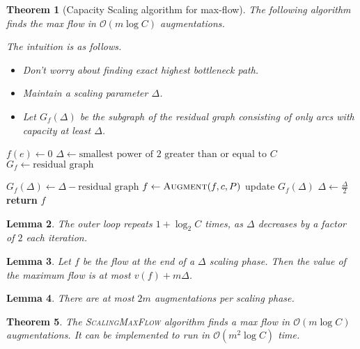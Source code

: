 \documentclass[10pt, oneside, reqno]{amsart}
\theoremstyle{plain}%
\newtheorem{thm}{Theorem}[section]
\newtheorem{lem}[thm]{Lemma}
\theoremstyle{definition}
\theoremstyle{remark}
\newcommand{\bigo}[1]{\mathcal{O}(#1)}
\begin{document}
\begin{thm}[Capacity Scaling algorithm for max-flow]
    The following algorithm finds the max flow in $\bigo{m \log C}$ augmentations.  
    
    The intuition is as follows.
    \begin{itemize}
        \item Don't worry about finding exact highest bottleneck path.
        \item Maintain a scaling parameter $\Delta$.  
        \item Let $G_f(\Delta)$ be the subgraph of the residual graph consisting of only arcs with capacity at least $\Delta$.
    \end{itemize}
    
\end{thm}
\begin{algorithm}[H]
    \label{alg:dynamic_rising_trend}
    \caption{Capacity scaling algorithm}
    \begin{algorithmic}[1]

         $f(e) \leftarrow 0$
        \EndFor
        \State $\Delta \leftarrow \text{smallest power of $2$ greater than or equal to $C$}$
        \State $G_f \leftarrow \text{residual graph}$
        
            \State $G_f(\Delta) \leftarrow \Delta-\text{residual graph}$
                \State $f \leftarrow \textsc{Augment}(f, c, P)$
                \State update $G_f(\Delta)$
            \EndWhile
            \State $\Delta \leftarrow \frac{\Delta}{2}$
        \EndWhile
        \State \textbf{return} $f$
    \EndProcedure
    \end{algorithmic}
\end{algorithm}

\begin{lem}
    The outer loop repeats $1 + \log_2{C}$ times, as $\Delta$ decreases by a factor of $2$ each iteration.
\end{lem}

\begin{lem}
    Let $f$ be the flow at the end of a $\Delta$ scaling phase.  Then the value of the maximum flow is at most $v(f) + m \Delta$. 
\end{lem}

\begin{lem}
    There are at most $2m$ augmentations per scaling phase.
\end{lem}
\begin{thm}
    The \textsc{ScalingMaxFlow} algorithm finds a max flow in $\bigo{m \log C}$ augmentations.  It can be implemented to run in $\bigo{m^2 \log C}$ time.
\end{thm}
\end{document}
